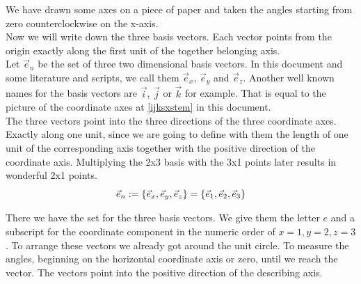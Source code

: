 \documentclass[a4paper]{article}
\begin{document}
We have drawn some axes on a piece of paper and taken the angles starting from zero counterclockwise on the x-axis.\\

Now we will write down the three basis vectors. Each vector points from the origin exactly along the first unit of the together belonging axis.\\

Let $\vec{e}_{n}$ be the set of three two dimensional basis vectors. In this document and some literature and scripts,
we call them $\vec{e}_x$, $\vec{e}_y$ and $\vec{e}_z$. Another well known names for the basis vectors are $\vec{i}$, 
$\vec{j}$ or $\vec{k}$ for example. That is equal to the picture of the coordinate axes at \ref{ijksxstem} in this document.\\

The three vectors point into the three directions of the three coordinate axes. Exactly along one unit, since we are going
to define with them the length of one unit of the corresponding axis together with the positive direction of the coordinate axis.
Multiplying the 2x3 basis with the 3x1 points later results in wonderful 2x1 points. \\

\begin{displaymath}
\vec{e}_{n} := \{\vec{e}_x, \vec{e}_y, \vec{e}_z\} = \{\vec{e}_1, \vec{e}_2, \vec{e}_3\}\\
\end{displaymath} 

There we have the set for the three basis vectors. We give them the letter $e$ and a subscript for the coordinate component in the numeric order of $x=1, y=2, z=3$. To arrange these vectors we already got around the unit circle. To measure the angles, beginning on the horizontal coordinate axis or zero, until we reach the vector. The vectors point into the positive direction of the describing axis.\\
\end{document}
